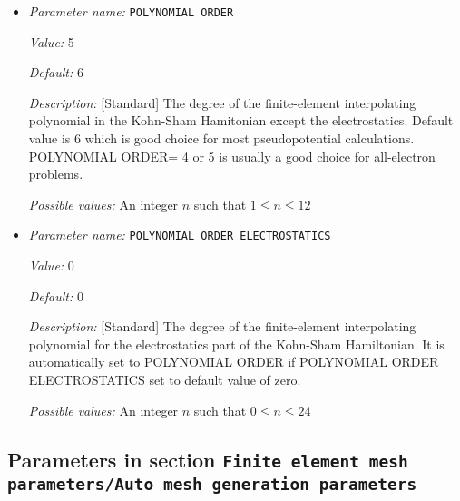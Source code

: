 \begin{itemize}
\item {\it Parameter name:} {\tt POLYNOMIAL ORDER}
\label{parameters:Finite element mesh parameters/POLYNOMIAL ORDER}
\label{parameters:Finite_20element_20mesh_20parameters/POLYNOMIAL_20ORDER}


{\it Value:} 5


{\it Default:} 6


{\it Description:} [Standard] The degree of the finite-element interpolating polynomial in the Kohn-Sham Hamitonian except the electrostatics. Default value is 6 which is good choice for most pseudopotential calculations. POLYNOMIAL ORDER= 4 or 5 is usually a good choice for all-electron problems.


{\it Possible values:} An integer $n$ such that $1\leq n \leq 12$
\item {\it Parameter name:} {\tt POLYNOMIAL ORDER ELECTROSTATICS}
\label{parameters:Finite element mesh parameters/POLYNOMIAL ORDER ELECTROSTATICS}
\label{parameters:Finite_20element_20mesh_20parameters/POLYNOMIAL_20ORDER_20ELECTROSTATICS}


{\it Value:} 0


{\it Default:} 0


{\it Description:} [Standard] The degree of the finite-element interpolating polynomial for the electrostatics part of the Kohn-Sham Hamiltonian. It is automatically set to POLYNOMIAL ORDER if POLYNOMIAL ORDER ELECTROSTATICS set to default value of zero.


{\it Possible values:} An integer $n$ such that $0\leq n \leq 24$
\end{itemize}



\subsection{Parameters in section \tt Finite element mesh parameters/Auto mesh generation parameters}
\label{parameters:Finite_20element_20mesh_20parameters/Auto_20mesh_20generation_20parameters}

